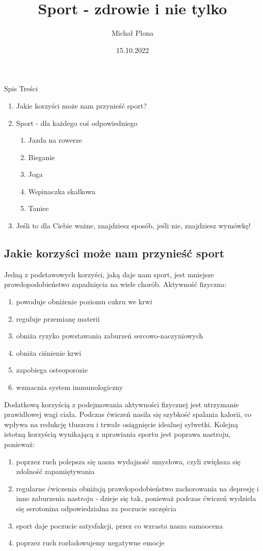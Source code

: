 \documentclass[12pt, letterpaper, titlepage]{article}
\title{Sport - zdrowie i nie tylko}
\author{Michał Plona}
\date{15.10.2022}
\begin{document}
\maketitle
\begin{center}
Spis Treści
\end{center}
\begin{enumerate}[1]
\item Jakie korzyści może nam przynieść sport?
\item Sport - dla każdego coś odpowiedniego
\begin{enumerate}[2.1]
\item Jazda na rowerze
\item Bieganie
\item Joga
\item Wspinaczka skałkowa
\item Taniec
\end{enumerate}
\item Jeśli to dla Ciebie ważne, znajdziesz sposób, jeśli nie, znajdziesz wymówkę!
\end{enumerate}
\newpage
\begin{center}
\section*{Jakie korzyści może nam przynieść sport}
\end{center}
Jedną z podstawowych korzyści, jaką daje nam sport, jest mniejsze prawdopodobieństwo zapadnięcia na wiele chorób. Aktywność fizyczna:
\begin{enumerate}[-]
\item powoduje obniżenie poziomu cukru we krwi
\item reguluje przemianę materii
\item obniża ryzyko powstawania zaburzeń sercowo-naczyniowych
\item obniża ciśnienie krwi
\item zapobiega osteoporozie
\item wzmacnia system immunologiczny
\end{enumerate}
Dodatkową korzyścią z podejmowania aktywności fizycznej jest utrzymanie prawidłowej wagi ciała. Podczas ćwiczeń nasila się szybkość spalania kalorii, co wpływa na redukcję tłuszczu i trwałe osiągnięcie idealnej sylwetki.
\newline
\newline  Kolejną istotną korzyścią wynikającą z uprawiania sportu jest poprawa nastroju, ponieważ:
\begin{enumerate}[-]
\item poprzez ruch polepsza się nasza wydajność umysłowa, czyli zwiększa się zdolność zapamiętywania
\item regularne ćwiczenia obniżają prawdopodobieństwo zachorowania na depresję i inne zaburzenia nastroju - dzieje się tak, ponieważ podczas ćwiczeń wydziela się serotonina odpowiedzialna za poczucie szczęścia
\item sport daje poczucie satysfakcji, przez co wzrasta nasza samoocena
\item poprzez ruch rozładowujemy negatywne emocje
\end{enumerate}
\end{document}
